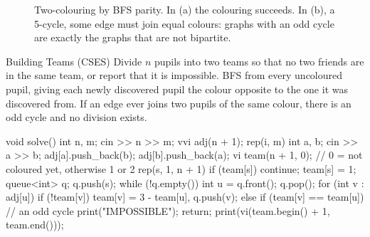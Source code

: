\begin{figure}[htbp]
\centering
{}
\caption{Two-colouring by BFS parity. In (a) the colouring succeeds. In (b), a 5-cycle, some edge must join equal colours:
graphs with an odd cycle are exactly the graphs that are not bipartite.}
\label{fig:bipartite}
\end{figure}

\begin{problem}{Building Teams (CSES)}
Divide $n$ pupils into two teams so that no two friends are in the same team, or report that it is impossible.
\solution BFS from every uncoloured pupil, giving each newly discovered pupil the colour opposite to the one it was discovered
from. If an edge ever joins two pupils of the same colour, there is an odd cycle and no division exists.
\end{problem}

\begin{code}
void solve() {
    int n, m;
    cin >> n >> m;
    vvi adj(n + 1);
    rep(i, m) {
        int a, b;
        cin >> a >> b;
        adj[a].push_back(b);
        adj[b].push_back(a);
    }
    vi team(n + 1, 0);  // 0 = not coloured yet, otherwise 1 or 2
    rep(s, 1, n + 1) {
        if (team[s]) continue;
        team[s] = 1;
        queue<int> q;
        q.push(s);
        while (!q.empty()) {
            int u = q.front();
            q.pop();
            for (int v : adj[u]) {
                if (!team[v]) team[v] = 3 - team[u], q.push(v);
                else if (team[v] == team[u]) {  // an odd cycle
                    print("IMPOSSIBLE");
                    return;
                }
            }
        }
    }
    print(vi(team.begin() + 1, team.end()));
}
\end{code}

